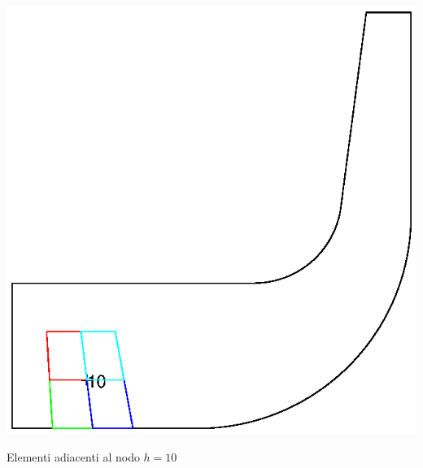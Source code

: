 \documentclass{tufte-handout}
\begin{document}
\begin{marginfigure}[-10mm]
    \centering
    \includegraphics{fem/elementi_adiacenti.eps}
    \caption{Elementi adiacenti al nodo $h=10$}
    \label{fig:my_label}
\end{marginfigure}
\end{document}
